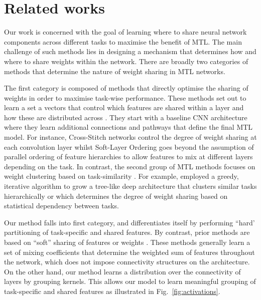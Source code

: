 \section{Related works}
\vspace{-2mm}
Our work is concerned with the goal of learning where to share neural network components across different tasks to maximise the benefit of MTL. The main challenge of such methods lies in designing a mechanism that determines how and where to share weights within the network. There are broadly two categories of methods that determine the nature of weight sharing in MTL networks.

The first category is composed of methods that directly optimise the sharing of weights in order to maximise task-wise performance. These methods set out to learn a set a vectors that control which features are shared within a layer and how these are distributed across \cite{long2017learning, meyerson2018beyond, MisraCrossMTL16, Ruder2019SluiceNL}. They start with a baseline CNN architecture where they learn additional connections and pathways that define the final MTL model. For instance, Cross-Stitch networks \cite{MisraCrossMTL16} control the degree of weight sharing at each convolution layer whilst Soft-Layer Ordering \cite{meyerson2018beyond} goes beyond the assumption of parallel ordering of feature hierarchies to allow features to mix at different layers depending on the task. In contrast, the second group of MTL methods focuses on weight clustering based on task-similarity \cite{xue2007multi, jacob2009, Kang2011,lu2017fully,mejjati2018multi}. For example, \cite{lu2017fully} employed a greedy, iterative algorithm to grow a tree-like deep architecture that clusters similar tasks hierarchically or \cite{mejjati2018multi} which determines the degree of weight sharing based on statistical dependency between tasks.

Our method falls into first category, and differentiates itself by performing ``hard' partitioning of task-specific and shared features. By contrast, prior methods are based on ``soft'' sharing of features \cite{MisraCrossMTL16,Ruder2019SluiceNL} or weights \cite{long2017learning,meyerson2018beyond}. These methods generally learn a set of mixing coefficients that determine the weighted sum of features throughout the network, which does not impose connectivity structures on the architecture. On the other hand, our method learns a distribution over the connectivity of layers by grouping kernels. This allows our model to learn meaningful grouping of task-specific and shared features as illustrated in Fig.~\ref{fig:activations}. 

